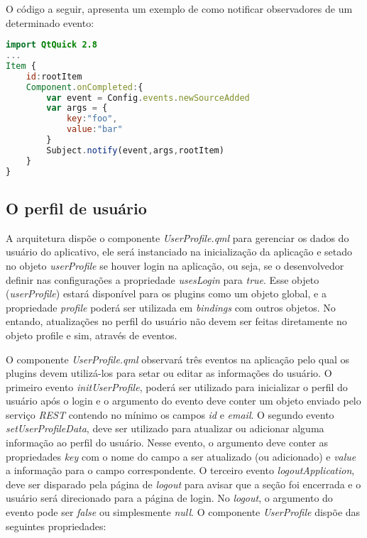 O código a seguir, apresenta um exemplo de como notificar observadores de um determinado evento:

\begin{center}
\begin{lstlisting}[language=qml]
import QtQuick 2.8
...
Item {
	id:rootItem
	Component.onCompleted:{
		var event = Config.events.newSourceAdded
		var args = {
			key:"foo",
			value:"bar"
		}
		Subject.notify(event,args,rootItem)
	}
}
\end{lstlisting}
\end{center}


\subsection{O perfil de usuário}\label{sec:solucao-desenvolvida}
A arquitetura dispõe o componente \textit{UserProfile.qml} para gerenciar os dados do usuário do aplicativo, ele será instanciado na inicialização da aplicação e setado no objeto \textit{userProfile} se houver login na aplicação, ou seja, se o desenvolvedor definir nas configurações a propriedade \textit{usesLogin} para \textit{true}. Esse objeto (\textit{userProfile}) estará disponível para os plugins como um objeto global, e a propriedade \textit{profile} poderá ser utilizada em \textit{bindings} com outros objetos. No entando, atualizações no perfil do usuário não devem ser feitas diretamente no objeto profile e sim, através de eventos.\par

O componente \textit{UserProfile.qml} observará três eventos na aplicação pelo qual os plugins devem utilizá-los para setar ou editar as informações do usuário. O primeiro evento \textit{initUserProfile}, poderá ser utilizado para inicializar o perfil do usuário após o login e o argumento do evento deve conter um objeto enviado pelo serviço \textit{REST} contendo no mínimo os campos \textit{id} e \textit{email}. O segundo evento \textit{setUserProfileData}, deve ser utilizado para atualizar ou adicionar alguma informação ao perfil do usuário. Nesse evento, o argumento deve conter as propriedades \textit{key} com o nome do campo a ser atualizado (ou adicionado) e \textit{value} a informação para o campo correspondente. O terceiro evento \textit{logoutApplication}, deve ser disparado pela página de \textit{logout} para avisar que a seção foi encerrada e o usuário será direcionado para a página de login. No \textit{logout}, o argumento do evento pode ser \textit{false} ou simplesmente \textit{null}. O componente \textit{UserProfile} dispõe das seguintes propriedades:

